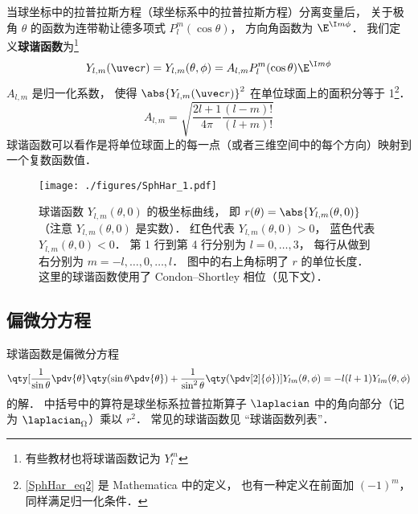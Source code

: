 

当球坐标中的拉普拉斯方程（球坐标系中的拉普拉斯方程）分离变量后， 关于极角 $\theta$ 的函数为连带勒让德多项式 $P_l^m(\cos\theta)$， 方向角函数为 $\E^{\I m\phi}$． 我们定义\textbf{球谐函数}为\footnote{有些教材也将球谐函数记为 $Y_l^m$}
\begin{equation}\label{SphHar_eq1}
Y_{l, m} (\uvec r) = Y_{l, m}(\theta, \phi) = A_{l,m} P_l^m(\cos \theta) \E^{\I m\phi}
\end{equation}
$A_{l,m}$ 是归一化系数， 使得 $\abs{Y_{l, m} (\uvec r)}^2$ 在单位球面上的面积分等于 1\footnote{\autoref{SphHar_eq2} 是 Mathematica 中的定义， 也有一种定义在前面加 $(-1)^m$， 同样满足归一化条件．}．
\begin{equation}\label{SphHar_eq2}
A_{l,m} =  \sqrt{\frac{2l + 1}{4\pi }\frac{(l - m)!}{(l + m)!}}
\end{equation}
球谐函数可以看作是将单位球面上的每一点（或者三维空间中的每个方向）映射到一个复数函数值．

\begin{figure}[ht]
\centering
\texttt{[image: ./figures/SphHar\_1.pdf]}
\caption{球谐函数 $Y_{l,m}(\theta, 0)$ 的极坐标曲线， 即 $r(\theta) = \abs{Y_{l,m}(\theta, 0)}$ （注意 $Y_{l,m}(\theta, 0)$ 是实数）． 红色代表 $Y_{l,m}(\theta, 0) > 0$， 蓝色代表 $Y_{l,m}(\theta, 0) < 0$． 第 1 行到第 4 行分别为 $l = 0, \dots, 3$， 每行从做到右分别为 $m = -l, \dots, 0, \dots, l$． 图中的右上角标明了 $r$ 的单位长度． 这里的球谐函数使用了 Condon–Shortley 相位（见下文）．} \label{SphHar_fig1}
\end{figure}

\subsection{偏微分方程}
球谐函数是偏微分方程
\begin{equation}
\qty[\frac{1}{\sin\theta}\pdv{\theta} \qty(\sin \theta \pdv{\theta}) + \frac{1}{\sin^2 \theta} \qty(\pdv[2]{\phi})]Y_{lm}(\theta, \phi) = -l(l+1)Y_{lm}(\theta, \phi)
\end{equation}
的解． 中括号中的算符是球坐标系拉普拉斯算子 $\laplacian$ 中的角向部分（记为 $\laplacian_\Omega$）乘以 $r^2$． 常见的球谐函数见 “球谐函数列表”．

